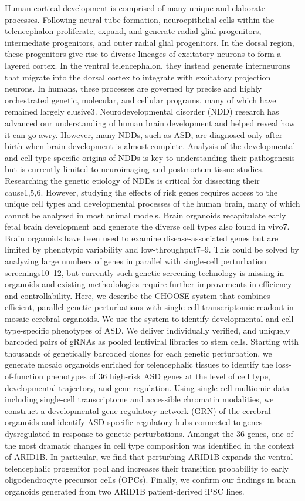 Human cortical development is comprised of many unique and elaborate processes. Following neural tube formation, neuroepithelial cells within the telencephalon proliferate, expand, and generate radial glial progenitors, intermediate progenitors, and outer radial glial progenitors. In the dorsal region, these progenitors give rise to diverse lineages of excitatory neurons to form a layered cortex. In the ventral telencephalon, they instead generate interneurons that migrate into the dorsal cortex to integrate with excitatory projection neurons. In humans, these processes are governed by precise and highly orchestrated genetic, molecular, and cellular programs, many of which have remained largely elusive3. 
Neurodevelopmental disorder (NDD) research has advanced our understanding of human brain development and helped reveal how it can go awry. However, many NDDs, such as ASD, are diagnosed only after birth when brain development is almost complete. Analysis of the developmental and cell-type specific origins of NDDs is key to understanding their pathogenesis but is currently limited to neuroimaging and postmortem tissue studies. 
Researching the genetic etiology of NDDs is critical for dissecting their cause1,5,6. However, studying the effects of risk genes requires access to the unique cell types and developmental processes of the human brain, many of which cannot be analyzed in most animal models. Brain organoids recapitulate early fetal brain development and generate the diverse cell types also found in vivo7. Brain organoids have been used to examine disease-associated genes but are limited by phenotypic variability and low-throughput7–9. This could be solved by analyzing large numbers of genes in parallel with single-cell perturbation screenings10–12, but currently such genetic screening technology is missing in organoids and existing methodologies require further improvements in efficiency and controllability. 
Here, we describe the CHOOSE system that combines efficient, parallel genetic perturbations with single-cell transcriptomic readout in mosaic cerebral organoids. We use the system to identify developmental and cell type-specific phenotypes of ASD. We deliver individually verified, and uniquely barcoded pairs of gRNAs as pooled lentiviral libraries to stem cells. Starting with thousands of genetically barcoded clones for each genetic perturbation, we generate mosaic organoids enriched for telencephalic tissues to identify the loss-of-function phenotypes of 36 high-risk ASD genes at the level of cell type, developmental trajectory, and gene regulation. Using single-cell multiomic data including single-cell transcriptome and accessible chromatin modalities, we construct a developmental gene regulatory network (GRN) of the cerebral organoids and identify ASD-specific regulatory hubs connected to genes dysregulated in response to genetic perturbations. Amongst the 36 genes, one of the most dramatic changes in cell type composition was identified in the context of ARID1B. In particular, we find that perturbing ARID1B expands the ventral telencephalic progenitor pool and increases their transition probability to early oligodendrocyte precursor cells (OPCs). Finally, we confirm our findings in brain organoids generated from two ARID1B patient-derived iPSC lines.

